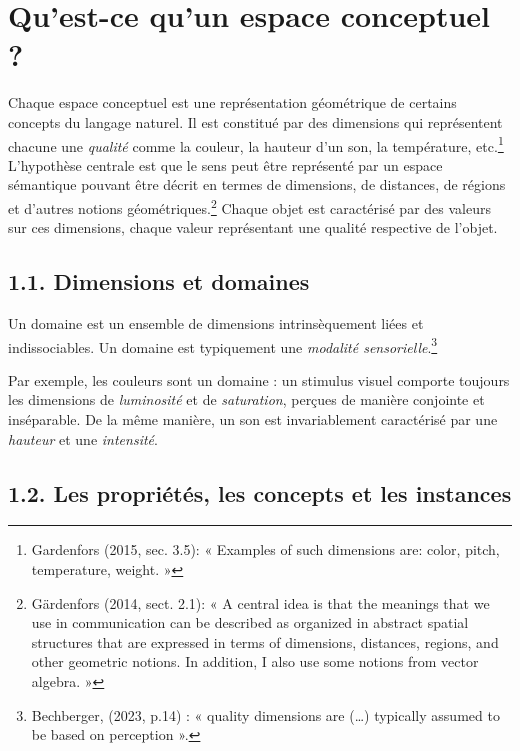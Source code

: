 \documentclass{article}
\begin{document}
\section*{Qu’est-ce qu’un espace conceptuel ?}
\doublespacing  %

Chaque espace conceptuel est une représentation géométrique de certains concepts du langage naturel. Il est constitué par des dimensions qui représentent chacune une \textit{qualité} comme la couleur, la hauteur d’un son, la température, etc.\footnote{Gardenfors (2015, sec. 3.5): « Examples of such dimensions are: color, pitch, temperature, weight. »}
L'hypothèse centrale est que le sens peut être représenté par un espace sémantique pouvant être décrit en termes de dimensions, de distances, de régions et d’autres notions géométriques.\footnote{Gärdenfors (2014, sect. 2.1): « A central idea is that the meanings that we use in communication can be described as organized in abstract spatial structures that are expressed in terms of dimensions, distances, regions, and other geometric notions. In addition, I also use some notions from vector algebra. »}
Chaque objet est caractérisé par des valeurs sur ces dimensions, chaque valeur représentant une qualité respective de l'objet.

\subsection*{1.1. Dimensions et domaines}
\doublespacing  %

Un domaine est un ensemble de dimensions intrinsèquement liées et indissociables. Un domaine est typiquement une \textit{modalité sensorielle}.\footnote{Bechberger, (2023, p.14) : «  quality dimensions are (…) typically assumed to be based on perception ».} 

Par exemple, les couleurs sont un domaine : un stimulus visuel comporte toujours les dimensions de \textit{luminosité} et de \textit{saturation}, perçues de manière conjointe et inséparable. De la même manière, un son est invariablement caractérisé par une \textit{hauteur} et une \textit{intensité}.

\subsection*{1.2. Les propriétés, les concepts et les instances}
\end{document}
